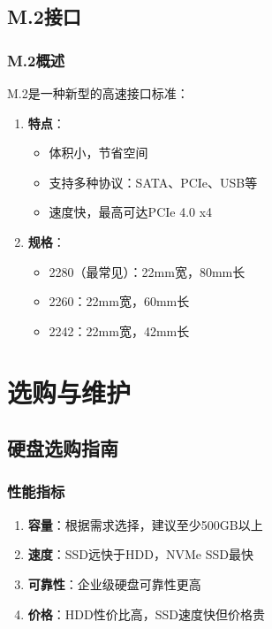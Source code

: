 \documentclass[12pt,UTF8]{ctexbook}
\begin{document}
\chapter{M.2接口}

\section{M.2概述}

M.2是一种新型的高速接口标准：

\begin{enumerate}
    \item \textbf{特点}：
    \begin{itemize}[leftmargin=2em]
        \item 体积小，节省空间
        \item 支持多种协议：SATA、PCIe、USB等
        \item 速度快，最高可达PCIe 4.0 x4
    \end{itemize}
    
    \item \textbf{规格}：
    \begin{itemize}[leftmargin=2em]
        \item 2280（最常见）：22mm宽，80mm长
        \item 2260：22mm宽，60mm长
        \item 2242：22mm宽，42mm长
    \end{itemize}
\end{enumerate}

\part{选购与维护}

\chapter{硬盘选购指南}

\section{性能指标}

\begin{enumerate}
    \item \textbf{容量}：根据需求选择，建议至少500GB以上
    \item \textbf{速度}：SSD远快于HDD，NVMe SSD最快
    \item \textbf{可靠性}：企业级硬盘可靠性更高
    \item \textbf{价格}：HDD性价比高，SSD速度快但价格贵
\end{enumerate}
\end{document}
